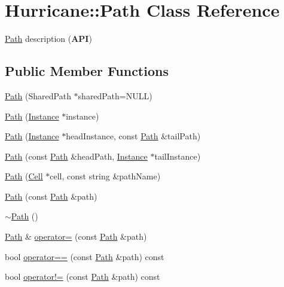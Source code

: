 \hypertarget{classHurricane_1_1Path}{}\section{Hurricane\+:\+:Path Class Reference}
\label{classHurricane_1_1Path}


\hyperlink{classHurricane_1_1Path}{Path} description ({\bfseries A\+PI})  


\subsection*{Public Member Functions}
\begin{DoxyCompactItemize}
\item 
\hyperlink{classHurricane_1_1Path_ad3fe735dcb2ce630f89b98c039663c23}{Path} (Shared\+Path $\ast$shared\+Path=N\+U\+LL)
\item 
\hyperlink{classHurricane_1_1Path_aa1a70f922b9b6a78fd3ac9b7bd94d158}{Path} (\hyperlink{classHurricane_1_1Instance}{Instance} $\ast$instance)
\item 
\hyperlink{classHurricane_1_1Path_a3197a114ed98117dde0f41d999917775}{Path} (\hyperlink{classHurricane_1_1Instance}{Instance} $\ast$head\+Instance, const \hyperlink{classHurricane_1_1Path}{Path} \&tail\+Path)
\item 
\hyperlink{classHurricane_1_1Path_add5812ab3bb9a4cf6dbe49d1e4e932cb}{Path} (const \hyperlink{classHurricane_1_1Path}{Path} \&head\+Path, \hyperlink{classHurricane_1_1Instance}{Instance} $\ast$tail\+Instance)
\item 
\hyperlink{classHurricane_1_1Path_a6e3d331f5c5a0dcb91d10516a4beb6bc}{Path} (\hyperlink{classHurricane_1_1Cell}{Cell} $\ast$cell, const string \&path\+Name)
\item 
\hyperlink{classHurricane_1_1Path_a8db875f788013ec5ad8ed517cf1e1715}{Path} (const \hyperlink{classHurricane_1_1Path}{Path} \&path)
\item 
\hyperlink{classHurricane_1_1Path_a6226639f50213598ffad86031afe69ff}{$\sim$\+Path} ()
\item 
\hyperlink{classHurricane_1_1Path}{Path} \& \hyperlink{classHurricane_1_1Path_a1355dd2d191d492a1b5e5180324a9f8f}{operator=} (const \hyperlink{classHurricane_1_1Path}{Path} \&path)
\item 
bool \hyperlink{classHurricane_1_1Path_a16a5b6529dd4424c55518ac9f687862f}{operator==} (const \hyperlink{classHurricane_1_1Path}{Path} \&path) const
\item 
bool \hyperlink{classHurricane_1_1Path_a182e82a2bc3f41262e1e76fcdc5a0c1e}{operator!=} (const \hyperlink{classHurricane_1_1Path}{Path} \&path) const

\end{DoxyCompactItemize}
